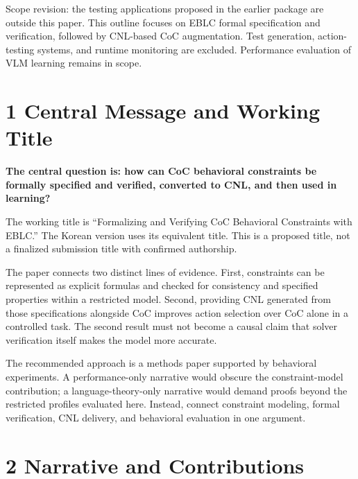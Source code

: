 \documentclass[11pt,a4paper]{article}
\begin{document}
Scope revision: the testing applications proposed in the earlier package are outside this paper. This outline focuses on EBLC formal specification and verification, followed by CNL-based CoC augmentation. Test generation, action-testing systems, and runtime monitoring are excluded. Performance evaluation of VLM learning remains in scope.\par

\section*{1 Central Message and Working Title}

\textbf{The central question is: how can CoC behavioral constraints be formally specified and verified, converted to CNL, and then used in learning?}\par

The working title is “Formalizing and Verifying CoC Behavioral Constraints with EBLC.” The Korean version uses its equivalent title. This is a proposed title, not a finalized submission title with confirmed authorship.\par

The paper connects two distinct lines of evidence. First, constraints can be represented as explicit formulas and checked for consistency and specified properties within a restricted model. Second, providing CNL generated from those specifications alongside CoC improves action selection over CoC alone in a controlled task. The second result must not become a causal claim that solver verification itself makes the model more accurate.\par

The recommended approach is a methods paper supported by behavioral experiments. A performance-only narrative would obscure the constraint-model contribution; a language-theory-only narrative would demand proofs beyond the restricted profiles evaluated here. Instead, connect constraint modeling, formal verification, CNL delivery, and behavioral evaluation in one argument.\par

\section*{2 Narrative and Contributions}
\end{document}
